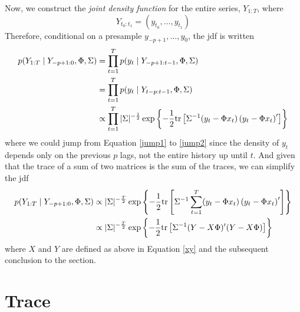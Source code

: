 \documentclass[a4paper,12pt]{scrartcl}
\begin{document}
Now, we construct the \emph{joint density function} for
the entire series, $Y_{1:T}$, where 
    \[ Y_{t_0:t_1} = (y_{t_0}, \ldots, y_{t_1}) \]
Therefore, conditional on a presample $y_{-p+1}, \ldots, y_0$, 
the jdf is written
\begin{align}
    p(Y_{1:T} \; | \; Y_{-p+1:0}, \Phi, \Sigma)
	&= \prod_{t=1}^T p(y_t \; | \; Y_{-p+1:t-1}, \Phi, \Sigma) 
	\label{jump1} \\
    &= \prod_{t=1}^T p(y_t \; | \; Y_{t-p:t-1}, \Phi, \Sigma) 
	\label{jump2} \\
    &\propto \prod_{t=1}^T
	|\Sigma|^{-\frac{1}{2}} 
	\exp\left\{ -\frac{1}{2} \text{tr} \left[ \Sigma^{-1}  
	(y_t - \Phi x_t)\left(y_t - \Phi x_t\right)'
	\right]\right\} \notag
\end{align}
where we could jump from Equation \ref{jump1} to \ref{jump2}
since the density of $y_t$ depends only on the previous
$p$ lags, not the entire history up until $t$. 
And given that the trace of a sum of two matrices is the
sum of the traces, we can simplify the jdf
\begin{align}
    p(Y_{1:T} \; | \; Y_{-p+1:0}, \Phi, \Sigma)
	&\propto 
	|\Sigma|^{-\frac{T}{2}} 
	\exp\left\{ -\frac{1}{2} \text{tr} \left[ \Sigma^{-1}  
	\sum^T_{t=1} (y_t - \Phi x_t)\left(y_t - \Phi x_t\right)'
	\right]\right\} \notag \\
    &\propto 
	|\Sigma|^{-\frac{T}{2}} 
	\exp\left\{ -\frac{1}{2} \text{tr} \left[ \Sigma^{-1}  
	(Y - X\Phi)'(Y-X\Phi)\right]\right\} \notag
\end{align}
where $X$ and $Y$ are defined as above in Equation \ref{xy}
and the subsequent conclusion to the section.





\newpage
\appendix
\section{Trace}
\end{document}
